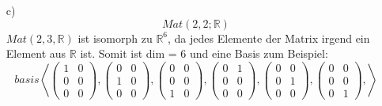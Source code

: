\documentclass{article}
\begin{document}
\begin{enumerate}
        \item[c)] \[Mat(2,2;\mathbb{R})\]
        \newline
        $Mat(2,3,\mathbb{R})$ ist isomorph zu $\mathbb{R}^6$, da jedes 
        Elemente der Matrix irgend ein Element aus $\mathbb{R}$ ist.
        Somit ist dim = 6 und eine Basis zum Beispiel:
        \[basis\left<
        \left(\begin{array}{cc}1&0\\0&0\\0&0\end{array}\right),
        \left(\begin{array}{cc}0&0\\1&0\\0&0\end{array}\right),
        \left(\begin{array}{cc}0&0\\0&0\\1&0\end{array}\right),
        \left(\begin{array}{cc}0&1\\0&0\\0&0\end{array}\right),
        \left(\begin{array}{cc}0&0\\0&1\\0&0\end{array}\right),
        \left(\begin{array}{cc}0&0\\0&0\\0&1\end{array}\right),\right>\]


\end{enumerate}
\end{document}
